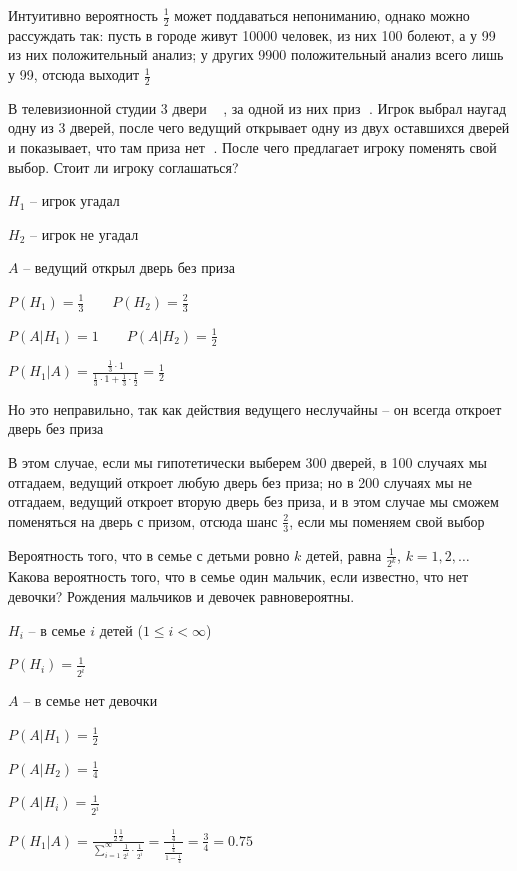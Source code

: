 \documentclass[12pt]{article}
\begin{document}
    Интуитивно вероятность $\frac{1}{2}$ может поддаваться непониманию, однако можно рассуждать так:
    пусть в городе живут 10000 человек, из них 100 болеют, а у 99 из них положительный анализ; у других 9900 положительный анализ всего лишь у 99, отсюда выходит $\frac{1}{2}$

     В телевизионной студии 3 двери {\Large 🚪🚪🚪}, за одной из них приз {\Large 🚗}.
    Игрок выбрал наугад одну из 3 дверей, после чего ведущий открывает одну из двух оставшихся дверей и показывает, что там приза нет {\Large 🛴}. После чего
    предлагает игроку поменять свой выбор. Стоит ли игроку соглашаться?

    $H_1$ -- игрок угадал

    $H_2$ -- игрок не угадал

    $A$ -- ведущий открыл дверь без приза

    $P(H_1) = \frac{1}{3} \quad\quad P(H_2) = \frac{2}{3}$

    $P(A|H_1) = 1 \quad\quad P(A|H_2) = \frac{1}{2}$

    $P(H_1|A) = \frac{\frac{1}{3} \cdot 1}{\frac{1}{3} \cdot 1 + \frac{1}{3} \cdot \frac{1}{2}} = \frac{1}{2}$

    Но это неправильно, так как действия ведущего неслучайны -- он всегда откроет дверь без приза

    В этом случае, если мы гипотетически выберем 300 дверей, в 100 случаях мы отгадаем, ведущий откроет любую дверь без приза;
    но в 200 случаях мы не отгадаем, ведущий откроет вторую дверь без приза, и в этом случае мы сможем поменяться на дверь с призом,
    отсюда шанс $\frac{2}{3}$, если мы поменяем свой выбор \hfill


     Вероятность того, что в семье с детьми ровно $k$ детей, равна $\frac{1}{2^k}$, $k = 1, 2, \dots$
    Какова вероятность того, что в семье один мальчик, если известно, что нет
    девочки? Рождения мальчиков и девочек равновероятны.


    $H_i$ -- в семье $i$ детей ($1 \leq i < \infty$)

    $P(H_i) = \frac{1}{2^i}$

    $A$ -- в семье нет девочки

    $P(A|H_1) = \frac{1}{2}$

    $P(A|H_2) = \frac{1}{4}$

    $P(A|H_i) = \frac{1}{2^i}$

    $P(H_1 | A) = \frac{\frac{1}{2} \frac{1}{2}}{\sum_{i = 1}^\infty \frac{1}{2^i} \cdot \frac{1}{2^i}} = \frac{\frac{1}{4}}{\frac{\frac{1}{4}}{1 - \frac{1}{4}}} = \frac{3}{4} = 0.75$
\end{document}
